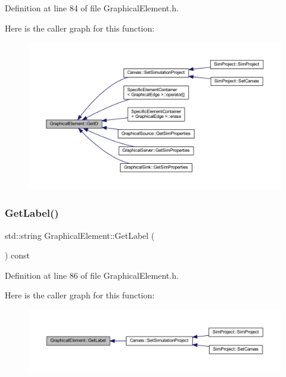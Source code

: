 Definition at line 84 of file Graphical\+Element.\+h.

Here is the caller graph for this function\+:
\nopagebreak
\begin{figure}[H]
\begin{center}
\leavevmode
\includegraphics[width=350pt]{class_graphical_element_a09ed630bc819c852f96ed20dda8d84e8_icgraph}
\end{center}
\end{figure}
\mbox{\label{class_graphical_element_a82ab7426dc354b2a91bf0ccc0a34b0b3}} 
\subsubsection{\texorpdfstring{Get\+Label()}{GetLabel()}}
{\footnotesize\ttfamily std\+::string Graphical\+Element\+::\+Get\+Label (\begin{DoxyParamCaption}{ }\end{DoxyParamCaption}) const\hspace{0.3cm}{\ttfamily [inline]}}



Definition at line 86 of file Graphical\+Element.\+h.

Here is the caller graph for this function\+:
\nopagebreak
\begin{figure}[H]
\begin{center}
\leavevmode
\includegraphics[width=350pt]{class_graphical_element_a82ab7426dc354b2a91bf0ccc0a34b0b3_icgraph}
\end{center}
\end{figure}
\mbox{\label{class_graphical_element_a23d2d7494818f017ca0f0ea4f36f54b5}} 
